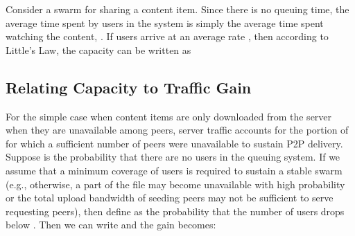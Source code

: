 \documentclass[10pt, conference, letterpaper]{IEEEtran}
\begin{document}
Consider a swarm  for sharing a content item. Since there is no queuing time, the average time spent by users in the system is simply the average time spent watching the content, . If users arrive at an average rate , then according to Little's Law, the capacity can be written as 


\subsection{Relating Capacity to Traffic Gain}
For the simple case when content items are only downloaded from the server when they are unavailable among peers,  server traffic accounts for the portion of  for which a sufficient number of peers were unavailable to sustain P2P delivery. Suppose  is the probability that there are no users in the queuing system. If we assume that a minimum coverage of  users is required to sustain a stable swarm (e.g., otherwise, a part of the file may become unavailable with high probability or the total upload bandwidth of seeding peers may not be sufficient to serve requesting peers), then define  as the probability that the number of users drops below .
Then we can write 
 and the gain becomes:
  
\end{document}
